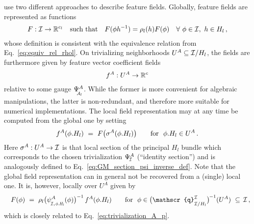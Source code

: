 \citet{Cohen2018-intertwiners}\cite{Cohen2019-generaltheory} use two different approaches to describe feature fields.
Globally, feature fields are represented as functions
\begin{align}\label{eq:mackey_functions}
    F: \mathcal{I} \to \mathbb{R}^{c_l}
    \quad \textup{such that} \quad
    F(\phi h^{-1}) = \rho_l(h) F(\phi)
    \quad \forall\ \phi\in\mathcal{I},\ h\in H_l \,,
\end{align}
whose definition is consistent with the equivalence relation from Eq.~\eqref{eq:equiv_rel_rhol}.
On trivializing neighborhoods $U^A \subseteq \mathcal{I}/H_l$, the fields are furthermore given by feature vector coefficient fields
\begin{align}
    f^A: U^A \to \mathbb{R}^c
\end{align}
relative to some gauge $\PsiAl^A$.
While the former is more convenient for algebraic manipulations, the latter is non-redundant, and therefore more suitable for numerical implementations.
The local field representation may at any time be computed from the global one by setting
\begin{align}
    f^A( \phi.H_l)\ =\ F\big( \sigma^A (\phi.H_l) \big)
    \qquad \textup{for}\ \ \phi.H_l \in U^A \,.
\end{align}
Here $\sigma^A: U^A \to \mathcal{I}$ is that local section of the principal $H_l$ bundle which corresponds to the chosen trivialization $\PsiI^A$ (``identity section'') and is analogously defined to Eq.~\eqref{eq:GM_section_psi_inverse_def}.
Note that the global field representation can in general not be recovered from a (single) local one.
It is, however, locally over $U^A$ given by
\begin{align}
    \quad
    F(\phi)\ =\ \rho_l\big( \psiI{\phi.H_l}^A(\phi) \big)^{-1}\, f^A(\phi.H_l)
    \qquad \textup{for}\ \ \phi \in \big(\mathscr{q}^{\I}_{\overset{}{\I/H_l}} \big)^{\mkern-2mu-1} (U^A)\ \subseteq\,\I \,,
\end{align}
which is closely related to Eq.~\eqref{eq:trivialization_A_p}.


